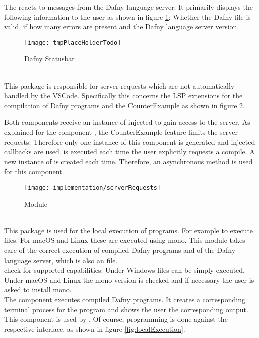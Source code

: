 The  reacts to messages from the Dafny language server.
It primarily displays the following information to the user as shown in figure \ref{fig:statusbar}:
Whether the Dafny file is valid, if how many errors are present and the Dafny language server version.

\begin{figure}[H]
    \centering
    \texttt{[image: tmpPlaceHolderTodo]}
    \caption{Dafny Statusbar}
    \label{fig:statusbar}
\end{figure}

\textbf{}\\
This package is responsible for server requests which are not automatically handled by the VSCode.
Specifically this concerns the LSP extensions for the compilation of Dafny programs and the CounterExample
as shown in figure \ref{fig:serverRequests}.

Both components receive an instance of  injected to gain access to the server.
As explained for the component ,
the CounterExample feature limits the server requests.
Therefore only one instance of this component is generated and injected callbacks are used.
 is executed each time the user explicitly requests a compile.
A new instance of  is created each time.
Therefore, an asynchronous method is used for this component.

\begin{figure}[H]
    \centering
    \texttt{[image: implementation/serverRequests]}
    \caption{Module }
    \label{fig:serverRequests}
\end{figure}

\textbf{}\\
This package is used for the local execution of programs.
For example to execute  files.
For macOS and Linux these are executed using mono.
This module takes care of the correct execution of compiled Dafny programs
and of the Dafny language server, which is also an  file.\\

 check for supported capabilities.
Under Windows  files can be simply executed.
Under macOS and Linux the mono version is checked and if necessary the user is asked to install mono. \\

The component   executes compiled Dafny programs.
It creates a corresponding terminal process
for the program and shows the user the corresponding output.
This component is used by .
Of course, programming is done against the respective interface, as shown in figure \ref{fig:localExecution}.

